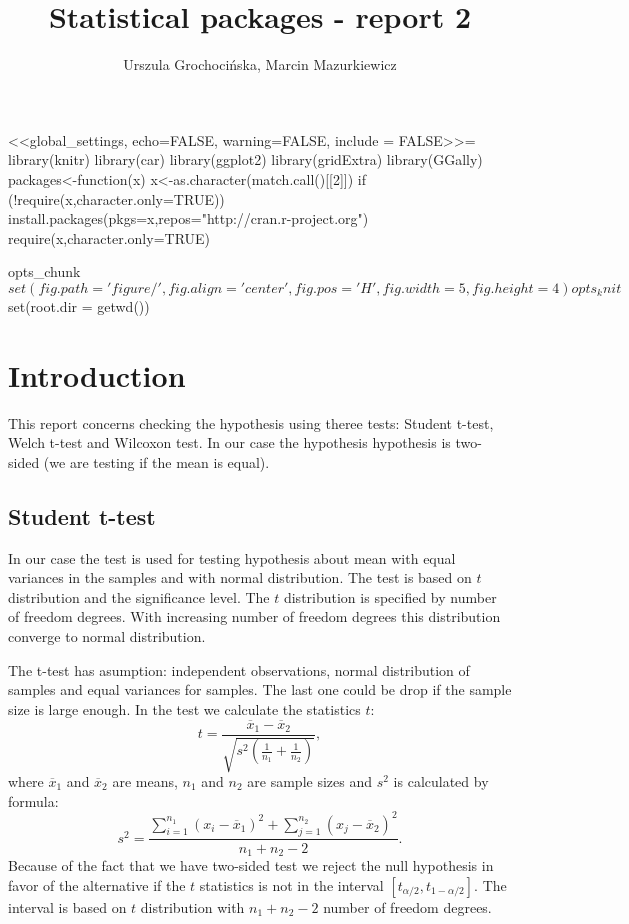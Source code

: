 \documentclass{article}
\begin{document}
  <<global_settings, echo=FALSE, warning=FALSE, include = FALSE>>=
library(knitr)
library(car)
library(ggplot2)
library(gridExtra)
library(GGally)
packages<-function(x){
  x<-as.character(match.call()[[2]])
  if (!require(x,character.only=TRUE)){
    install.packages(pkgs=x,repos="http://cran.r-project.org")
    require(x,character.only=TRUE)
  }
}

opts_chunk$set(fig.path='figure/', fig.align='center', fig.pos='H',fig.width=5, fig.height=4)
opts_knit$set(root.dir = getwd())
  
  


\title{Statistical packages - report 2}
\author{Urszula Grochocińska, Marcin Mazurkiewicz}
\maketitle
\tableofcontents 


  \section{Introduction}
This report concerns checking the hypothesis using theree tests: Student t-test, Welch t-test and Wilcoxon test. In our case the hypothesis hypothesis is two-sided (we are testing if the mean is equal).
  \subsection{Student t-test}
In our case the test is used for testing hypothesis about mean with equal variances in the samples and with normal distribution. The test is based on $t$ distribution and the significance level. The $t$ distribution is specified by number of freedom degrees. With increasing number of freedom degrees this distribution converge to normal distribution.

  The t-test has asumption: independent observations, normal distribution of samples and equal variances for samples. The last one could be drop if the sample size is large enough.
  In the test we calculate the statistics $t$:
  \begin{equation}
  t=\frac{\overline{x}_1-\overline{x}_2}{\sqrt{s^2\left(\frac{1}{n_1}+\frac{1}{n_2}\right)}},
  \end{equation}
where $\overline{x}_1$ and $\overline{x}_2$ are means, $n_1$ and $n_2$ are sample sizes and $s^2$ is calculated by formula:
  \begin{equation}
    s^2=\frac{\sum_{i=1}^{n_1}(x_i-\overline{x}_1)^2+\sum_{j=1}^{n_2}(x_j-\overline{x}_2)^2}{n_1+n_2-2}.
  \end{equation}
Because of the fact that we have two-sided test we reject the null hypothesis in favor of the alternative if the $t$ statistics is not in the interval $[t_{\alpha/2}, t_{1-\alpha/2}]$. The interval is based on $t$ distribution with $n_1+n_2-2$ number of freedom degrees.
\end{document}
